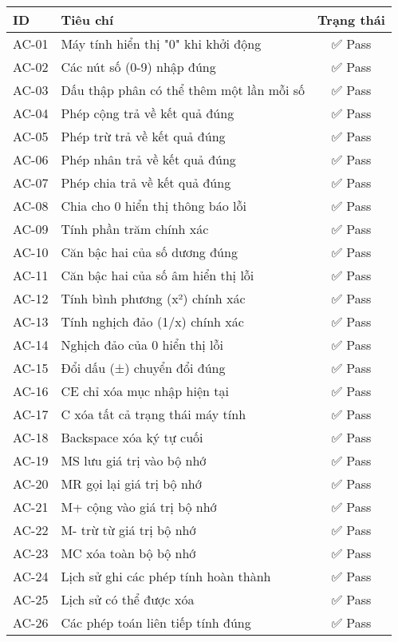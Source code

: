 \begin{longtable}{|l|p{8cm}|c|}
\hline
\textbf{ID} & \textbf{Tiêu chí} & \textbf{Trạng thái} \\
\hline
\endhead
AC-01 & Máy tính hiển thị "0" khi khởi động & ✅ Pass \\
AC-02 & Các nút số (0-9) nhập đúng & ✅ Pass \\
AC-03 & Dấu thập phân có thể thêm một lần mỗi số & ✅ Pass \\
AC-04 & Phép cộng trả về kết quả đúng & ✅ Pass \\
AC-05 & Phép trừ trả về kết quả đúng & ✅ Pass \\
AC-06 & Phép nhân trả về kết quả đúng & ✅ Pass \\
AC-07 & Phép chia trả về kết quả đúng & ✅ Pass \\
AC-08 & Chia cho 0 hiển thị thông báo lỗi & ✅ Pass \\
AC-09 & Tính phần trăm chính xác & ✅ Pass \\
AC-10 & Căn bậc hai của số dương đúng & ✅ Pass \\
AC-11 & Căn bậc hai của số âm hiển thị lỗi & ✅ Pass \\
AC-12 & Tính bình phương (x²) chính xác & ✅ Pass \\
AC-13 & Tính nghịch đảo (1/x) chính xác & ✅ Pass \\
AC-14 & Nghịch đảo của 0 hiển thị lỗi & ✅ Pass \\
AC-15 & Đổi dấu (±) chuyển đổi đúng & ✅ Pass \\
AC-16 & CE chỉ xóa mục nhập hiện tại & ✅ Pass \\
AC-17 & C xóa tất cả trạng thái máy tính & ✅ Pass \\
AC-18 & Backspace xóa ký tự cuối & ✅ Pass \\
AC-19 & MS lưu giá trị vào bộ nhớ & ✅ Pass \\
AC-20 & MR gọi lại giá trị bộ nhớ & ✅ Pass \\
AC-21 & M+ cộng vào giá trị bộ nhớ & ✅ Pass \\
AC-22 & M- trừ từ giá trị bộ nhớ & ✅ Pass \\
AC-23 & MC xóa toàn bộ bộ nhớ & ✅ Pass \\
AC-24 & Lịch sử ghi các phép tính hoàn thành & ✅ Pass \\
AC-25 & Lịch sử có thể được xóa & ✅ Pass \\
AC-26 & Các phép toán liên tiếp tính đúng & ✅ Pass \\
\hline
\end{longtable}

